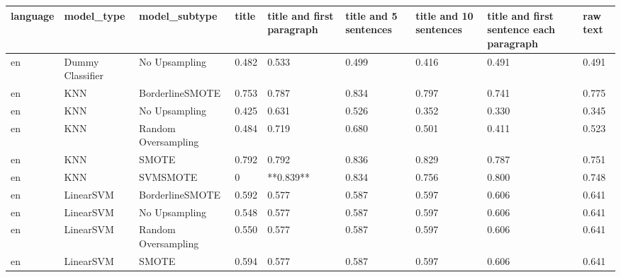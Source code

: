 \begin{tabular}{lllllllll}
\toprule
language &                   model\_type &       model\_subtype & title & title and first paragraph & title and 5 sentences & title and 10 sentences & title and first sentence each paragraph &  raw text \\
\midrule
      en &             Dummy Classifier &       No Upsampling & 0.482 &                     0.533 &                 0.499 &                  0.416 &                                   0.491 &     0.491 \\
      en &                          KNN &     BorderlineSMOTE & 0.753 &                     0.787 &                 0.834 &                  0.797 &                                   0.741 &     0.775 \\
      en &                          KNN &       No Upsampling & 0.425 &                     0.631 &                 0.526 &                  0.352 &                                   0.330 &     0.345 \\
      en &                          KNN & Random Oversampling & 0.484 &                     0.719 &                 0.680 &                  0.501 &                                   0.411 &     0.523 \\
      en &                          KNN &               SMOTE & 0.792 &                     0.792 &                 0.836 &                  0.829 &                                   0.787 &     0.751 \\
      en &                          KNN &            SVMSMOTE &     0 &                 **0.839** &                 0.834 &                  0.756 &                                   0.800 &     0.748 \\
      en &                    LinearSVM &     BorderlineSMOTE & 0.592 &                     0.577 &                 0.587 &                  0.597 &                                   0.606 &     0.641 \\
      en &                    LinearSVM &       No Upsampling & 0.548 &                     0.577 &                 0.587 &                  0.597 &                                   0.606 &     0.641 \\
      en &                    LinearSVM & Random Oversampling & 0.550 &                     0.577 &                 0.587 &                  0.597 &                                   0.606 &     0.641 \\
      en &                    LinearSVM &               SMOTE & 0.594 &                     0.577 &                 0.587 &                  0.597 &                                   0.606 &     0.641 \\

\end{tabular}
